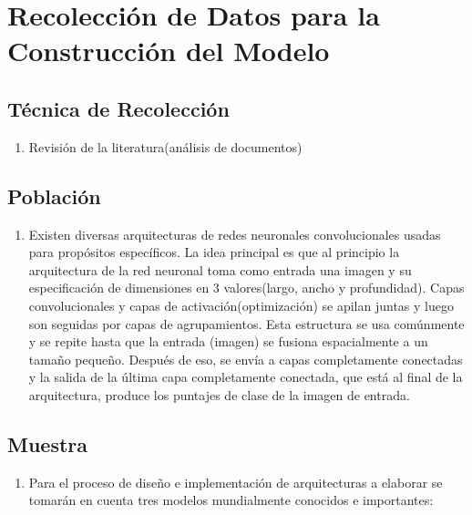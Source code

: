 	\vskip 0.4cm
	\section{Recolección de Datos para la Construcción del Modelo}
		
		\subsection{Técnica de Recolección}
		\begin{enumerate}		
			\item[]   {Revisión de la literatura(análisis de documentos)}
		\end{enumerate}

		\subsection{Población}
		\begin{enumerate}		
			\item[] Existen diversas arquitecturas de redes neuronales convolucionales usadas para propósitos específicos. La idea principal es que al principio la arquitectura de la red neuronal toma como entrada una imagen y su especificación de dimensiones en 3 valores(largo, ancho y profundidad). Capas convolucionales y capas de activación(optimización) se apilan juntas y luego son seguidas por capas de agrupamientos. Esta estructura se usa comúnmente y se repite hasta que la entrada (imagen) se fusiona espacialmente a un tamaño pequeño. Después de eso, se envía a capas completamente conectadas y la salida de la última capa completamente conectada, que está al final de la arquitectura, produce los puntajes de clase de la imagen de entrada.
		\end{enumerate}
		
	
		\subsection{Muestra}
		\begin{enumerate}		
		\item[] Para el proceso de diseño e implementación de arquitecturas a elaborar se tomarán en cuenta tres modelos mundialmente conocidos e importantes:
		\end{enumerate}
				
